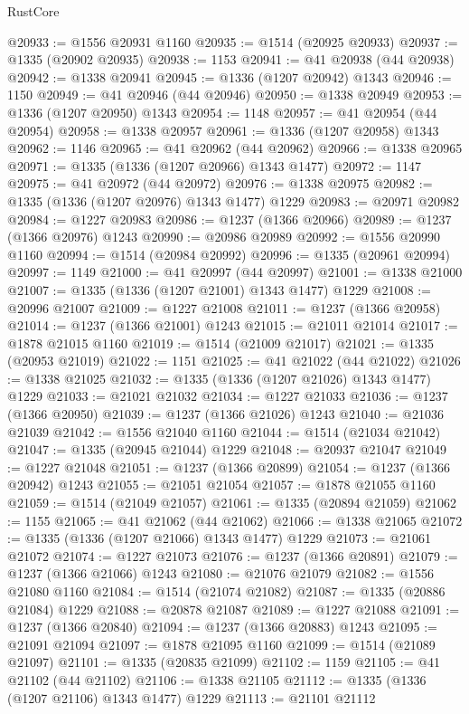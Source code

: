 \begin{lexlean}{RustCore}
\begin{coremodule}
@20933 := @1556 @20931 @1160
@20935 := @1514 (@20925 @20933)
@20937 := @1335 (@20902 @20935)
@20938 := 1153
@20941 := @41 @20938 (@44 @20938)
@20942 := @1338 @20941
@20945 := @1336 (@1207 @20942) @1343
@20946 := 1150
@20949 := @41 @20946 (@44 @20946)
@20950 := @1338 @20949
@20953 := @1336 (@1207 @20950) @1343
@20954 := 1148
@20957 := @41 @20954 (@44 @20954)
@20958 := @1338 @20957
@20961 := @1336 (@1207 @20958) @1343
@20962 := 1146
@20965 := @41 @20962 (@44 @20962)
@20966 := @1338 @20965
@20971 := @1335 (@1336 (@1207 @20966) @1343 @1477)
@20972 := 1147
@20975 := @41 @20972 (@44 @20972)
@20976 := @1338 @20975
@20982 := @1335 (@1336 (@1207 @20976) @1343 @1477) @1229
@20983 := @20971 @20982
@20984 := @1227 @20983
@20986 := @1237 (@1366 @20966)
@20989 := @1237 (@1366 @20976) @1243
@20990 := @20986 @20989
@20992 := @1556 @20990 @1160
@20994 := @1514 (@20984 @20992)
@20996 := @1335 (@20961 @20994)
@20997 := 1149
@21000 := @41 @20997 (@44 @20997)
@21001 := @1338 @21000
@21007 := @1335 (@1336 (@1207 @21001) @1343 @1477) @1229
@21008 := @20996 @21007
@21009 := @1227 @21008
@21011 := @1237 (@1366 @20958)
@21014 := @1237 (@1366 @21001) @1243
@21015 := @21011 @21014
@21017 := @1878 @21015 @1160
@21019 := @1514 (@21009 @21017)
@21021 := @1335 (@20953 @21019)
@21022 := 1151
@21025 := @41 @21022 (@44 @21022)
@21026 := @1338 @21025
@21032 := @1335 (@1336 (@1207 @21026) @1343 @1477) @1229
@21033 := @21021 @21032
@21034 := @1227 @21033
@21036 := @1237 (@1366 @20950)
@21039 := @1237 (@1366 @21026) @1243
@21040 := @21036 @21039
@21042 := @1556 @21040 @1160
@21044 := @1514 (@21034 @21042)
@21047 := @1335 (@20945 @21044) @1229
@21048 := @20937 @21047
@21049 := @1227 @21048
@21051 := @1237 (@1366 @20899)
@21054 := @1237 (@1366 @20942) @1243
@21055 := @21051 @21054
@21057 := @1878 @21055 @1160
@21059 := @1514 (@21049 @21057)
@21061 := @1335 (@20894 @21059)
@21062 := 1155
@21065 := @41 @21062 (@44 @21062)
@21066 := @1338 @21065
@21072 := @1335 (@1336 (@1207 @21066) @1343 @1477) @1229
@21073 := @21061 @21072
@21074 := @1227 @21073
@21076 := @1237 (@1366 @20891)
@21079 := @1237 (@1366 @21066) @1243
@21080 := @21076 @21079
@21082 := @1556 @21080 @1160
@21084 := @1514 (@21074 @21082)
@21087 := @1335 (@20886 @21084) @1229
@21088 := @20878 @21087
@21089 := @1227 @21088
@21091 := @1237 (@1366 @20840)
@21094 := @1237 (@1366 @20883) @1243
@21095 := @21091 @21094
@21097 := @1878 @21095 @1160
@21099 := @1514 (@21089 @21097)
@21101 := @1335 (@20835 @21099)
@21102 := 1159
@21105 := @41 @21102 (@44 @21102)
@21106 := @1338 @21105
@21112 := @1335 (@1336 (@1207 @21106) @1343 @1477) @1229
@21113 := @21101 @21112

\end{coremodule}
\end{lexlean}
